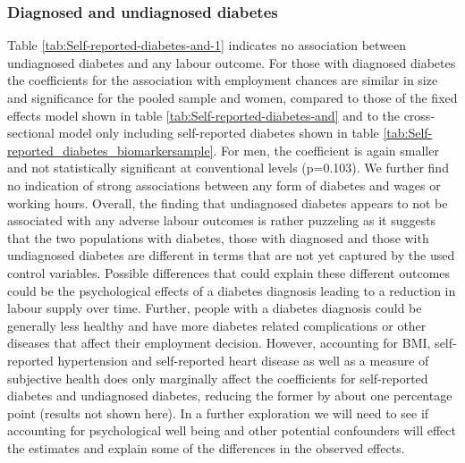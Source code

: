 \subsubsection*{Diagnosed and undiagnosed diabetes}

 Table \ref{tab:Self-reported-diabetes-and-1}
indicates no association between undiagnosed
diabetes and any labour outcome. For those with diagnosed
diabetes the coefficients for the association with employment chances
are similar in size and significance for the pooled sample and women,
compared to those of the fixed effects model shown in table \ref{tab:Self-reported-diabetes-and} and to the cross-sectional model only including self-reported diabetes shown in table \ref{tab:Self-reported_diabetes_biomarkersample}.
For men, the coefficient is again smaller and not statistically significant
at conventional levels (p=0.103). We further find no indication of strong associations
between any form of diabetes and wages or working hours. 
Overall, the finding that undiagnosed diabetes appears to not be associated with any adverse labour outcomes is rather puzzeling as it suggests that the two populations with diabetes, those with diagnosed and those with undiagnosed diabetes are different in terms that are not yet captured by the used control variables. Possible differences that could explain these different outcomes could be the psychological effects of a diabetes diagnosis leading to a reduction in labour supply over time. Further, people with a diabetes diagnosis could be generally less healthy and have more diabetes related complications or other diseases that affect their employment decision. However, accounting for BMI, self-reported hypertension and self-reported heart disease as well as a measure of subjective health does only marginally affect the coefficients for self-reported diabetes and undiagnosed diabetes, reducing the former by about one percentage point (results not shown here). In a further exploration we will need to see if accounting for psychological well being and other potential confounders will effect the estimates and explain some of the differences in the observed effects.

